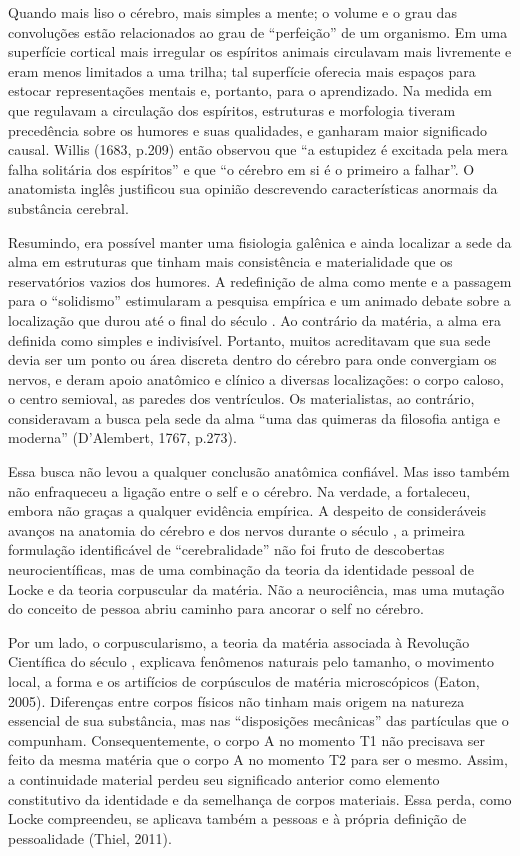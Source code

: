 Quando mais liso o cérebro, mais simples a mente; o volume e o grau das
convoluções estão relacionados ao grau de ``perfeição'' de um organismo.
Em uma superfície cortical mais irregular os espíritos animais
circulavam mais livremente e eram menos limitados a uma trilha; tal
superfície oferecia mais espaços para estocar representações mentais e,
portanto, para o aprendizado. Na medida em que regulavam a circulação
dos espíritos, estruturas e morfologia tiveram precedência sobre os
humores e suas qualidades, e ganharam maior significado causal. Willis
(1683, p.209) então observou que ``a estupidez é excitada pela mera
falha solitária dos espíritos'' e que ``o cérebro em si é o primeiro a
falhar''. O anatomista inglês justificou sua opinião descrevendo
características anormais da substância cerebral.

Resumindo, era possível manter uma fisiologia galênica e ainda localizar
a sede da alma em estruturas que tinham mais consistência e
materialidade que os reservatórios vazios dos humores. A redefinição de
alma como mente e a passagem para o ``solidismo'' estimularam a pesquisa
empírica e um animado debate sobre a localização que durou até o final
do século . Ao contrário da matéria, a alma era definida como
simples e indivisível. Portanto, muitos acreditavam que sua sede devia
ser um ponto ou área discreta dentro do cérebro para onde convergiam os
nervos, e deram apoio anatômico e clínico a diversas localizações: o
corpo caloso, o centro semioval, as paredes dos ventrículos. Os
materialistas, ao contrário, consideravam a busca pela sede da alma
``uma das quimeras da filosofia antiga e moderna'' (D'Alembert, 1767,
p.273).

Essa busca não levou a qualquer conclusão anatômica confiável. Mas isso
também não enfraqueceu a ligação entre o self e o cérebro. Na verdade, a
fortaleceu, embora não graças a qualquer evidência empírica. A despeito
de consideráveis avanços na anatomia do cérebro e dos nervos durante o
século , a primeira formulação identificável de ``cerebralidade''
não foi fruto de descobertas neurocientíficas, mas de uma combinação da
teoria da identidade pessoal de Locke e da teoria corpuscular da
matéria. Não a neurociência, mas uma mutação do conceito de pessoa abriu
caminho para ancorar o self no cérebro.

Por um lado, o corpuscularismo, a teoria da matéria associada à
Revolução Científica do século , explicava fenômenos naturais pelo
tamanho, o movimento local, a forma e os artifícios de corpúsculos de
matéria microscópicos (Eaton, 2005). Diferenças entre corpos físicos não
tinham mais origem na natureza essencial de sua substância, mas nas
``disposições mecânicas'' das partículas que o compunham.
Consequentemente, o corpo A no momento T1 não precisava ser feito da
mesma matéria que o corpo A no momento T2 para ser o mesmo. Assim, a
continuidade material perdeu seu significado anterior como elemento
constitutivo da identidade e da semelhança de corpos materiais. Essa
perda, como Locke compreendeu, se aplicava também a pessoas e à própria
definição de pessoalidade (Thiel, 2011).

